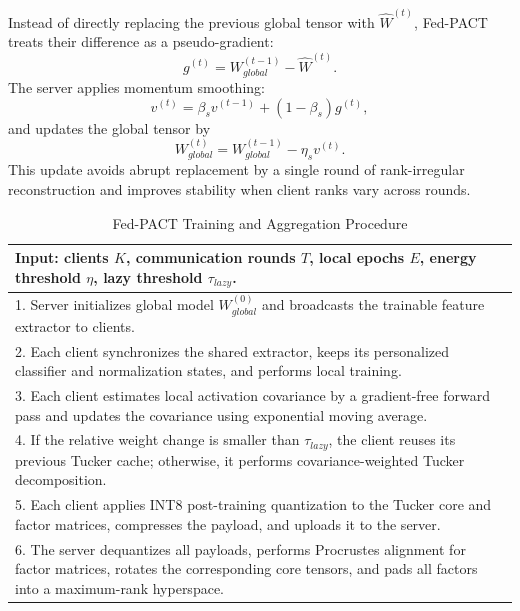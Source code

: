 \documentclass[conference]{IEEEtran}
\begin{document}
Instead of directly replacing the previous global tensor with $\hat{W}^{(t)}$, Fed-PACT treats their difference as a pseudo-gradient:
\begin{equation}
    g^{(t)}=W_{global}^{(t-1)}-\hat{W}^{(t)}.
\end{equation}
The server applies momentum smoothing:
\begin{equation}
    v^{(t)}=\beta_s v^{(t-1)}+(1-\beta_s)g^{(t)},
\end{equation}
and updates the global tensor by
\begin{equation}
    W_{global}^{(t)}=W_{global}^{(t-1)}-\eta_s v^{(t)}.
\end{equation}
This update avoids abrupt replacement by a single round of rank-irregular reconstruction and improves stability when client ranks vary across rounds.
\begin{table}[t]
    \caption{Fed-PACT Training and Aggregation Procedure}
    \label{tab:algorithm}
    \centering
    \begin{tabular}{p{}}
        \toprule
        \textbf{Input:} clients $K$, communication rounds $T$, local epochs $E$, energy threshold $\eta$, lazy threshold $\tau_{lazy}$.                                                            \\
        \midrule
        1. Server initializes global model $W_{global}^{(0)}$ and broadcasts the trainable feature extractor to clients.                                                                           \\
        2. Each client synchronizes the shared extractor, keeps its personalized classifier and normalization states, and performs local training.                                                 \\
        3. Each client estimates local activation covariance by a gradient-free forward pass and updates the covariance using exponential moving average.                                          \\
        4. If the relative weight change is smaller than $\tau_{lazy}$, the client reuses its previous Tucker cache; otherwise, it performs covariance-weighted Tucker decomposition.              \\
        5. Each client applies INT8 post-training quantization to the Tucker core and factor matrices, compresses the payload, and uploads it to the server.                                       \\
        6. The server dequantizes all payloads, performs Procrustes alignment for factor matrices, rotates the corresponding core tensors, and pads all factors into a maximum-rank hyperspace.    \\

\end{tabular}
\end{table}
\end{document}
